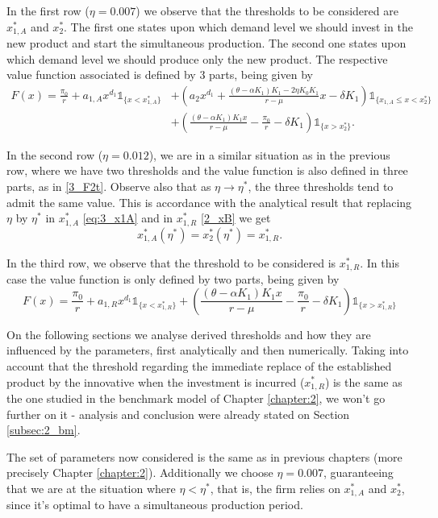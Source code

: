 In the first row ($\eta=0.007$) we observe that the thresholds to be considered are $x_{1,A}^*$ and $x_2^*$. The first one states upon which demand level we should invest in the new product and start the simultaneous production. The second one states upon which demand level we should produce only the new product. The respective value function associated is defined by 3 parts, being given by 
\begin{equation}
\begin{split}
F(x)=\frac{\pi_0}{r}+
	a_{1,A}x^{d_1}  \mathds{1}_{ \{x<x^*_{1,A} \}}&+
	\left( a_2x^{d_1}+\frac{(\theta-\alpha K_1)K_1-2 \eta K_0 K_1}{r-\mu} x - \delta K_1 \right)  \mathds{1}_{ \{ x_{1,A} \leq x < x_2^* \}}\\
	&+
	\left(  \frac{(\theta-\alpha K_1)K_1 x}{r-\mu} -\frac{\pi_0}{r} - \delta K_1 \right)   \mathds{1}_{ \{ x>x_2^*  \} }.
\end{split}
	\label{3_F2t}
\end{equation}	

In the second row ($\eta=0.012$), we are in a similar situation as in the previous row, where we have two thresholds and the value function is also defined in three parts, as in \eqref{3_F2t}.
Observe also that as $\eta \to \eta^*$, the three thresholds tend to admit the same value. This is accordance with the analytical result that replacing $\eta$ by $\eta^*$ in $x^*_{1,A}$ \eqref{eq:3_x1A} and in $x^*_{1,R}$ \eqref{2_xB} we get
$$x^*_{1,A}(\eta^*)=x_2^*(\eta^*)=x^*_{1,R}.$$


In the third row, we observe that the threshold to be considered is $x_{1,R}^*$. In this case the value function is only defined by two parts, being given by
$$F(x)=\frac{\pi_0}{r}+
	a_{1,R}x^{d_1} \mathds{1}_{ \{ x<x_{1,R}^* \} }+
	\left(  \frac{(\theta-\alpha K_1)K_1 x}{r-\mu} -\frac{\pi_0}{r} - \delta K_1 \right)  \mathds{1}_{ \{ x>x_{1,R}^* \} }$$

\vspace{3mm}
On the following sections we analyse derived thresholds and how they are influenced by the parameters, first analytically and then numerically. 
Taking into account that the threshold regarding the immediate replace of the established product by the innovative when the investment is incurred ($x^*_{1,R}$) is the same as the one studied in the benchmark model of Chapter \ref{chapter:2}, we won't go further on it - analysis and conclusion were already stated on Section \ref{subsec:2_bm}.

The set of parameters now considered is the same as in previous chapters (more precisely Chapter \ref{chapter:2}). Additionally we choose $\eta=0.007$, guaranteeing that we are at the situation where $\eta <\eta^*$, that is, the firm relies on $x^*_{1,A}$ and $x^*_2$, since it's optimal to have a simultaneous production period.
